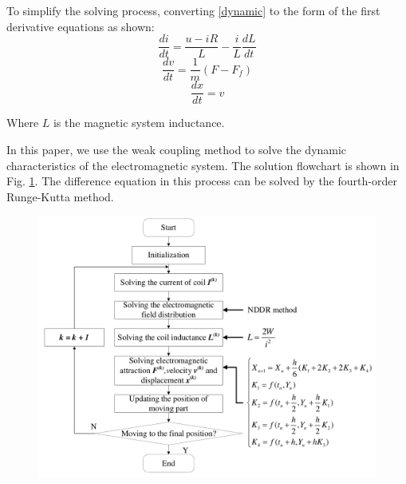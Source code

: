 \documentclass[journal,transmag]{IEEEtran}
\begin{document}
To simplify the solving process, converting \eqref{dynamic} to the form of the first derivative equations as shown:
\begin{equation}
\frac{{di}}{{dt}} = \frac{{u - iR}}{L} - \frac{i}{L}\frac{{dL}}{{dt}}
\label{i}
\end{equation}
\begin{equation}
\frac{{dv}}{{dt}} = \frac{1}{m}(F - {F_f})
\label{v}
\end{equation}
\begin{equation}
\frac{{dx}}{{dt}} = v
\label{x}
\end{equation}

Where $L$ is the magnetic system inductance.

In this paper, we use the weak coupling method to solve the dynamic characteristics of the electromagnetic system. The solution flowchart is shown in Fig. \ref{fig:flowchart}. The difference equation in this process can be solved by the fourth-order Runge-Kutta method.
\begin{figure}
	\centering
	\includegraphics[width=1.0\linewidth]{flowchart.pdf}
	\caption{}
	\label{fig:flowchart}
\end{figure}
\end{document}
